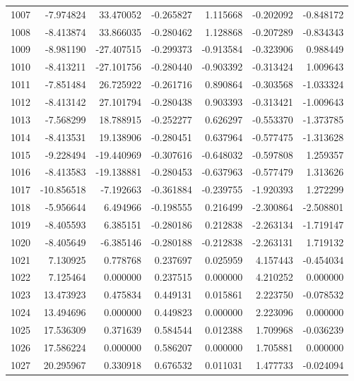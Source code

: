 \begin{tabular}{rrrrrrr}
1007 &  -7.974824 &   33.470052 & -0.265827 &    1.115668 &   -0.202092 & -0.848172 \\
1008 &  -8.413874 &   33.866035 & -0.280462 &    1.128868 &   -0.207289 & -0.834343 \\
1009 &  -8.981190 &  -27.407515 & -0.299373 &   -0.913584 &   -0.323906 &  0.988449 \\
1010 &  -8.413211 &  -27.101756 & -0.280440 &   -0.903392 &   -0.313424 &  1.009643 \\
1011 &  -7.851484 &   26.725922 & -0.261716 &    0.890864 &   -0.303568 & -1.033324 \\
1012 &  -8.413142 &   27.101794 & -0.280438 &    0.903393 &   -0.313421 & -1.009643 \\
1013 &  -7.568299 &   18.788915 & -0.252277 &    0.626297 &   -0.553370 & -1.373785 \\
1014 &  -8.413531 &   19.138906 & -0.280451 &    0.637964 &   -0.577475 & -1.313628 \\
1015 &  -9.228494 &  -19.440969 & -0.307616 &   -0.648032 &   -0.597808 &  1.259357 \\
1016 &  -8.413583 &  -19.138881 & -0.280453 &   -0.637963 &   -0.577479 &  1.313626 \\
1017 & -10.856518 &   -7.192663 & -0.361884 &   -0.239755 &   -1.920393 &  1.272299 \\
1018 &  -5.956644 &    6.494966 & -0.198555 &    0.216499 &   -2.300864 & -2.508801 \\
1019 &  -8.405593 &    6.385151 & -0.280186 &    0.212838 &   -2.263134 & -1.719147 \\
1020 &  -8.405649 &   -6.385146 & -0.280188 &   -0.212838 &   -2.263131 &  1.719132 \\
1021 &   7.130925 &    0.778768 &  0.237697 &    0.025959 &    4.157443 & -0.454034 \\
1022 &   7.125464 &    0.000000 &  0.237515 &    0.000000 &    4.210252 &  0.000000 \\
1023 &  13.473923 &    0.475834 &  0.449131 &    0.015861 &    2.223750 & -0.078532 \\
1024 &  13.494696 &    0.000000 &  0.449823 &    0.000000 &    2.223096 &  0.000000 \\
1025 &  17.536309 &    0.371639 &  0.584544 &    0.012388 &    1.709968 & -0.036239 \\
1026 &  17.586224 &    0.000000 &  0.586207 &    0.000000 &    1.705881 &  0.000000 \\
1027 &  20.295967 &    0.330918 &  0.676532 &    0.011031 &    1.477733 & -0.024094 \\

\end{tabular}
